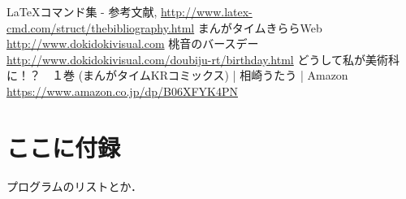 \documentclass[12pt,a4paper,dvipdfmx]{jsarticle}
\begin{document}
\begin{thebibliography}{9}
     LaTeXコマンド集 - 参考文献,
        \url{http://www.latex-cmd.com/struct/thebibliography.html}
     まんがタイムきららWeb
        \url{http://www.dokidokivisual.com}
     桃音のバースデー
        \url{http://www.dokidokivisual.com/doubiju-rt/birthday.html}
     どうして私が美術科に！？　１巻 (まんがタイムKRコミックス) | 相崎うたう | Amazon\\
        \url{https://www.amazon.co.jp/dp/B06XFYK4PN}
\end{thebibliography}

\appendix
\section{ここに付録}
プログラムのリストとか．
\end{document}
